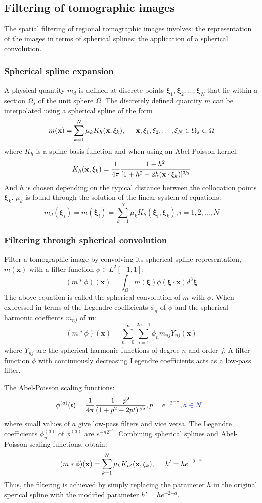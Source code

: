 \documentclass{article}
\newcommand{\mbf}[1]{\mathbf{#1}}
\newcommand{\myno}[1]{{\color{blue}#1}}
\begin{document}
\subsection{Filtering of tomographic images}
The spatial filtering of regional tomographic images involves: the representation of the images in terms of spherical splines; the application of a spherical convolution.\par
\subsubsection{Spherical spline expansion}
A physical quantity $m_d$ is defined at discrete points $\mbf\xi_1,\mbf\xi_2,\ldots,\mbf\xi_N$ that lie within a section $\Omega_s$ of the unit sphere $\Omega$. The discretely defined quantity $m$ can be interpolated using a spherical spline of the form
\[ m(\mbf x)=\sum_{k=1}^N\mu_kK_h(\mbf x,\mbf\xi_k), \hspace{5mm} \mbf x,\mbf\xi_1,\mbf\xi_2,\ldots,\mbf\xi_N\in\Omega_s\subset\Omega  \]
where $K_h$ is a spline basis function and when using an Abel-Poisson kernel:
\[ K_h(\mbf x,\mbf\xi_k)=\frac{1}{4\pi}\frac{1-h^2}{[1+h^2-2h(\mbf x\cdot\mbf\xi_k)]^{\nicefrac{3}{2}}} \]
And $h$ is chosen depending on the typical distance between the collocation points $\mbf\xi_k$. $\mu_k$ is found through the solution of the linear system of equations:
\[ m_d(\mbf\xi_i)=m(\mbf\xi_i)=\sum_{k=1}^N\mu_kK_h(\mbf\xi_i,\mbf\xi_k),i=1,2,\ldots,N \]\par
\subsubsection{Filtering through spherical convolution}
Filter a tomographic image by convolving its spherical spline representation, $m(\mbf x)$ with a filter function $\phi\in L^2[-1,1]$:
\[ (m*\phi)(\mbf x)=\int_\Omega m(\mbf\xi)\phi(\mbf\xi\cdot\mbf x)d^3\mbf\xi \]
The above equation is called the spherical convolution of $m$ with $\phi$. When expressed in terms of the Legendre coefficients $\phi_n$ of $\phi$ and the spherical harmonic coeffients $m_{nj}$ of $\mbf m$:
\[ (m*\phi)(\mbf x)=\sum_{n=0}^\infty\sum_{j=1}^{2n+1}\phi_nm_{nj}Y_{nj}(\mbf x) \]
where $Y_{nj}$ are the spherical harmonic functions of degree $n$ and order $j$. A filter function $\phi$ with continuously decreasing Legendre coefficients acts as a low-pass filter.\par
The Abel-Poisson scaling functions:
\[ \phi^{(a)}(t)=\frac{1}{4\pi}\frac{1-p^2}{(1+p^2-2pt)^{\nicefrac{3}{2}}},p=e^{-2^{-a}}\myno{,a\in N^+} \]
where small values of $a$ give low-pass filters and vice versa. The Legendre coefficients $\phi_n^{(a)}$ of $\phi^{(a)}$ are $e^{-n2^{-a}}$. Combining spherical splines and Abel-Poisson scaling functions, obtain:
\[ (m*\phi)(\mbf x)=\sum_{k=1}^N\mu_kK_{h'}(\mbf x,\mbf\xi_k), \hspace{5mm} h'=he^{-2^{-a}} \]
Thus, the filtering is achieved by simply replacing the parameter $h$ in the original sperical spline with the modified parameter $h'=he^{-2{-a}}$.\par
\vspace{5mm}
\end{document}
